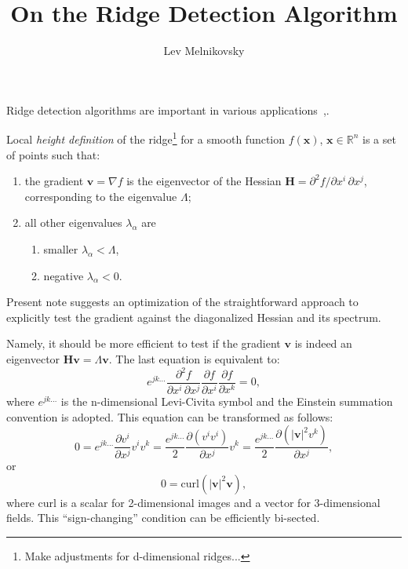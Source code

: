 \documentclass{article}
\author{Lev Melnikovsky}
\title{On the Ridge Detection Algorithm}
\newcommand{\pd}[2]{\ensuremath{\frac{\partial #1}{\partial #2}}}
\begin{document}
\maketitle

Ridge detection algorithms are important in various applications~\cite{ridges94},\cite{ridges96}.

Local \textit{height definition} of the ridge\footnote{Make adjustments for d-dimensional ridges...} for a smooth function $f(\mathbf{x})$, $\mathbf{x} \in \mathbb{R}^n$ is a set of points such that:
\begin{enumerate}
\item the gradient $\mathbf{v} = \nabla f$ is the eigenvector of the Hessian $\boldsymbol{H} = \partial^2 \! f/\partial x^i\, \partial x^j$, corresponding to the eigenvalue $\Lambda$;
\item all other eigenvalues $\lambda_\alpha$ are 
\begin{enumerate}
\item smaller $\lambda_\alpha < \Lambda$,
\item negative $\lambda_\alpha <0$.
\end{enumerate} 
\end{enumerate}

Present note suggests an optimization of the straightforward approach to explicitly test the gradient against the diagonalized Hessian and its spectrum.

Namely, it should be more efficient to test if the gradient $\mathbf{v}$ is indeed an eigenvector $\boldsymbol{H} \mathbf{v} = \Lambda\mathbf{v}$. The last equation is equivalent to:
\begin{equation}
e^{j k \dots}
\frac{\partial^2 \! f}{\partial x^i\, \partial x^j}
\pd{f}{x^i}\pd{f}{x^k}
=0,
\end{equation}
where $e^{j k \dots}$ is the n-dimensional Levi-Civita symbol and the Einstein summation convention is adopted. This equation can be transformed as follows:
\begin{equation}
0=
e^{j k \dots}
\pd{v^i}{x^j} v^i v^k=
\frac{e^{j k \dots}}{2}
\pd{(v^i v^i)}{x^j}  v^k=
\frac{e^{j k \dots}}{2}
\pd{(\left|\mathbf{v}\right|^2 v^k)}{x^j},
\end{equation}
or
\begin{equation}
\label{curl}
0=
\mathrm{curl} \left(\left|\mathbf{v}\right|^2 \mathbf{v}\right),
\end{equation}
where $\mathrm{curl}$ is a scalar for 2-dimensional images and a vector for 3-dimensional fields. This ``sign-changing'' condition can be efficiently bi-sected.
\end{document}
